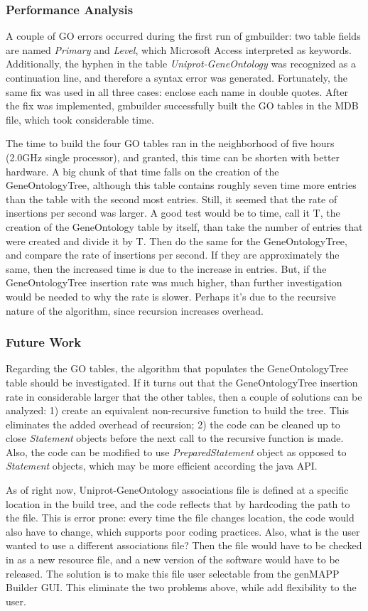 \subsubsection{Performance Analysis}
A couple of GO errors occurred during the first run of gmbuilder: two table fields are named \emph{Primary} and \emph{Level}, which
Microsoft Access interpreted as keywords. Additionally, the hyphen in the table \emph{Uniprot-GeneOntology}
was recognized  as a continuation line, and therefore a syntax error was generated. Fortunately, the same fix was used
in all three cases: enclose each name in double quotes. After the fix was implemented, gmbuilder successfully built the
GO tables in the MDB file, which took considerable time.

The time to build the four GO tables ran in the neighborhood of five hours (2.0GHz single processor), and
granted, this time can be shorten with better hardware. A big chunk of that time falls on the creation of the
GeneOntologyTree, although this table contains roughly seven time more entries than the table with the second
most entries. Still, it seemed that the rate of insertions per second was larger.
A good test would be to time, call it T, the creation of the
GeneOntology table by itself, than take the number of entries that were created and divide it by T. Then do the same for the
GeneOntologyTree, and compare the rate of insertions per second. If they are approximately the same, then the increased time
is due to the increase in entries. But, if the GeneOntologyTree insertion rate was much higher, than further investigation would be
needed to why the rate is slower. Perhaps it's due to the recursive nature of the algorithm, since recursion increases overhead.


\subsubsection{Future Work}
Regarding the GO tables, the algorithm that populates the GeneOntologyTree table should be investigated.
If it turns out that the GeneOntologyTree insertion rate in considerable larger that the other tables, then
a couple of solutions can be analyzed: 1) create an equivalent non-recursive function to build the tree. This
eliminates the added overhead of recursion; 2) the code can be cleaned up to
close \emph{Statement} objects before the next call to the recursive function is made. Also, the code can
be modified to use \emph{PreparedStatement} object as opposed to \emph{Statement} objects, which may be more
efficient according the java API.


As of right now, Uniprot-GeneOntology associations file is defined at a specific location in the build tree,
and the code reflects that by hardcoding the path to the file. This is error prone: every time the file changes location,
the code would also have to change, which supports poor coding practices. Also, what is the user wanted to use a different
associations file? Then the file would have to be checked in as a new resource file, and a new version of the software would have
to be released. The solution is to make this file user selectable from the genMAPP Builder GUI. This eliminate the two problems
above, while add flexibility to the user.
